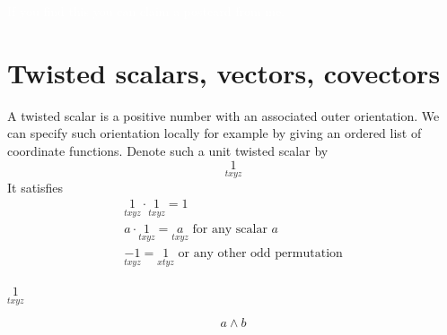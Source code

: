 \documentclass[\ifafour a4paper,12pt,\else a5paper,10pt,\fi%
onecolumn,oneside,article,%
british%
]{memoir}
\makeatletter
\theoremstyle{remark}
\theoremstyle{innote}
\def\sum{\DOTSI\sumop\slimits@}
\newcommand*{\de}{\partialup}%
\DeclareMathOperator{\tr}{tr}%
\newcommand*{\p}{\mathrm{P}}%
\renewcommand*{\|}[1][]{\nonscript\,#1\vert\nonscript\;\mathopen{}}
\newcommand*{\tsum}{\mathop{\textstyle\sum}\nolimits}
\newcommand*{\ts}[1][txyz]{\underset{#1}{1}}
\makeatother
\begin{document}
\textcolor{white}{If you find this you can claim a postcard from me.}



\section{Twisted scalars, vectors, covectors}
\label{sec:twisted}

A twisted scalar is a positive number with an associated outer orientation.
We can specify such orientation locally for example by giving an ordered
list of coordinate functions. Denote such a unit twisted scalar by
\begin{equation}
  \label{eq:twisted_scalar}
  \ts
\end{equation}
It satisfies
\begin{equation}
  \label{eq:twisted_scalar_properties}
  \begin{gathered}
    \ts \cdot \ts = 1
    \\
    a \cdot \ts = \underset{txyz}{a} \text{ for any scalar $a$}
    \\
    \underset{txyz}{-1} = \ts[xtyz] \text{ or any other odd permutation}
\end{gathered}
\end{equation}



$\ts$

$$a \land b$$




\end{document}
